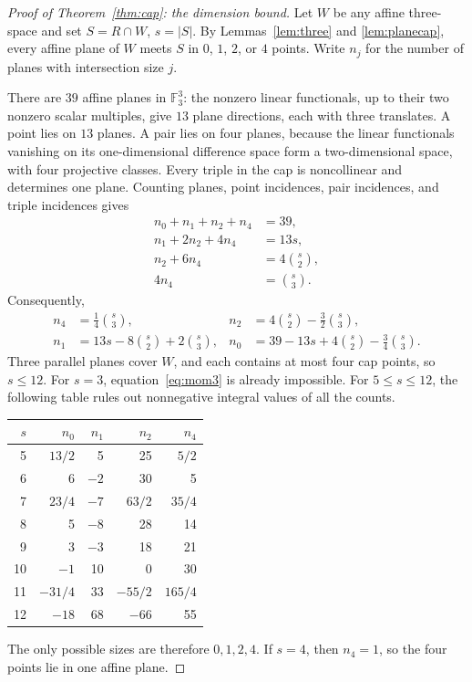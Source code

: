 \documentclass[11pt]{article}
\theoremstyle{remark}
\newcommand{\F}{\mathbb F_3}
\begin{document}
\begin{proof}[Proof of Theorem~\ref{thm:cap}: the dimension bound]
Let $W$ be any affine three-space and set $S=R\cap W$, $s=|S|$.
By Lemmas~\ref{lem:three} and \ref{lem:planecap}, every affine plane of $W$
meets $S$ in $0$, $1$, $2$, or $4$ points. Write $n_j$ for the number of
planes with intersection size $j$.

There are $39$ affine planes in $\F^3$: the nonzero linear functionals,
up to their two nonzero scalar multiples, give $13$ plane directions,
each with three translates. A point lies on $13$ planes. A pair lies on
four planes, because the linear functionals vanishing on its one-dimensional
difference space form a two-dimensional space, with four projective classes.
Every triple in the cap is noncollinear and determines one plane. Counting
planes, point incidences, pair incidences, and triple incidences gives
\begin{align}
 n_0+n_1+n_2+n_4&=39,\label{eq:mom0}\\
 n_1+2n_2+4n_4&=13s,\label{eq:mom1}\\
 n_2+6n_4&=4\binom{s}{2},\label{eq:mom2}\\
 4n_4&=\binom{s}{3}.\label{eq:mom3}
\end{align}
Consequently,
\begin{align*}
 n_4&=\frac14\binom{s}{3},&
 n_2&=4\binom{s}{2}-\frac32\binom{s}{3},\\
 n_1&=13s-8\binom{s}{2}+2\binom{s}{3},&
 n_0&=39-13s+4\binom{s}{2}-\frac34\binom{s}{3}.
\end{align*}
Three parallel planes cover $W$, and each contains at most four cap points,
so $s\leq12$. For $s=3$, equation~\eqref{eq:mom3} is already impossible.
For $5\leq s\leq12$, the following table rules out nonnegative integral
values of all the counts.
\begin{center}
\begin{tabular}{rrrrr}
\toprule
$s$ & $n_0$ & $n_1$ & $n_2$ & $n_4$\\
\midrule
5 & $13/2$ & 5 & 25 & $5/2$\\
6 & 6 & $-2$ & 30 & 5\\
7 & $23/4$ & $-7$ & $63/2$ & $35/4$\\
8 & 5 & $-8$ & 28 & 14\\
9 & 3 & $-3$ & 18 & 21\\
10 & $-1$ & 10 & 0 & 30\\
11 & $-31/4$ & 33 & $-55/2$ & $165/4$\\
12 & $-18$ & 68 & $-66$ & 55\\
\bottomrule
\end{tabular}
\end{center}
The only possible sizes are therefore $0,1,2,4$. If $s=4$, then $n_4=1$,
so the four points lie in one affine plane.


\end{proof}
\end{document}
